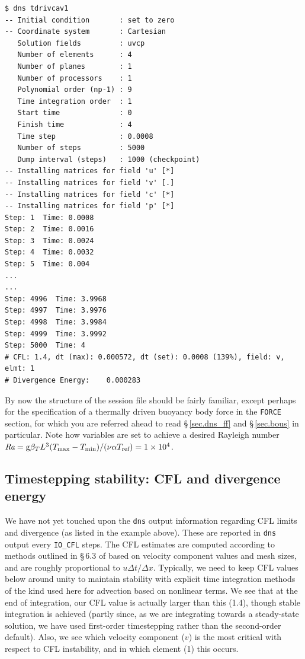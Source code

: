 \documentclass[11pt]{report}
\def\Ra{\mbox{\it Ra}}                              %
\newcommand\cg{\mathrm{g}}
\begin{document}
%
{\small
\begin{verbatim}
$ dns tdrivcav1
-- Initial condition       : set to zero
-- Coordinate system       : Cartesian
   Solution fields         : uvcp
   Number of elements      : 4
   Number of planes        : 1
   Number of processors    : 1
   Polynomial order (np-1) : 9
   Time integration order  : 1
   Start time              : 0
   Finish time             : 4
   Time step               : 0.0008
   Number of steps         : 5000
   Dump interval (steps)   : 1000 (checkpoint)
-- Installing matrices for field 'u' [*]
-- Installing matrices for field 'v' [.]
-- Installing matrices for field 'c' [*]
-- Installing matrices for field 'p' [*]
Step: 1  Time: 0.0008
Step: 2  Time: 0.0016
Step: 3  Time: 0.0024
Step: 4  Time: 0.0032
Step: 5  Time: 0.004
...
...
Step: 4996  Time: 3.9968
Step: 4997  Time: 3.9976
Step: 4998  Time: 3.9984
Step: 4999  Time: 3.9992
Step: 5000  Time: 4
# CFL: 1.4, dt (max): 0.000572, dt (set): 0.0008 (139%), field: v, elmt: 1
# Divergence Energy:    0.000283
\end{verbatim}
}

By now the structure of the session file should be fairly familiar,
except perhaps for the specification of a thermally driven buoyancy
body force in the \verb|FORCE| section, for which you are referred
ahead to read \S\,\ref{sec.dns_ff} and \S\,\ref{sec.bous} in
particular.  Note how variables are set to achieve a desired Rayleigh
number
$\Ra=\cg\beta_TL^3
(T_\textrm{max}-T_\textrm{min})/(\nu\alpha T_\textrm{ref})=1\times10^4$.

\subsection{Timestepping stability: CFL and divergence energy}
\label{sec.cfl}

We have not yet touched upon the \verb|dns| output information
regarding CFL limits and divergence (as listed in the example above).
These are reported in \verb|dns| output every \verb|IO_CFL| steps.
The CFL estimates are computed according to methods outlined in
\S\,6.3 of \citet{kars05} based on velocity component values and mesh
sizes, and are roughly proportional to $u\Delta t/\Delta x$.
Typically, we need to keep CFL values below around unity to maintain
stability with explicit time integration methods of the kind used here
for advection based on nonlinear terms.  We see that at the end of
integration, our CFL value is actually larger than this (1.4), though
stable integration is achieved (partly since, as we are integrating
towards a steady-state solution, we have used first-order timestepping
rather than the second-order default).  Also, we see which velocity
component ($v$) is the most critical with respect to CFL instability,
and in which element (1) this occurs.
\end{document}
